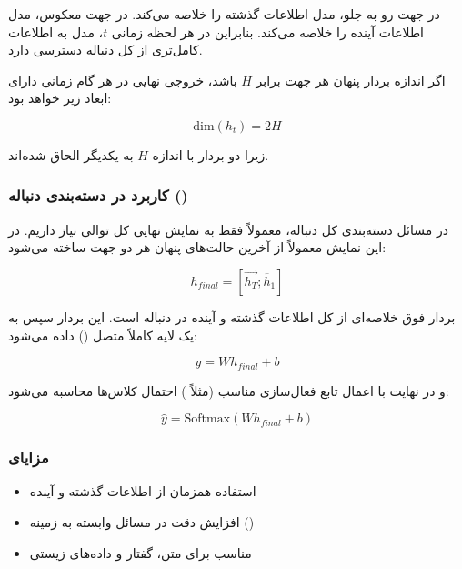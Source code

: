 \documentclass{article}
\begin{document}
در جهت رو به جلو، مدل اطلاعات گذشته را خلاصه می‌کند. 
در جهت معکوس، مدل اطلاعات آینده را خلاصه می‌کند. 
بنابراین در هر لحظه زمانی \( t \)، مدل به اطلاعات کامل‌تری از کل دنباله دسترسی دارد.

اگر اندازه بردار پنهان هر جهت برابر \( H \) باشد، خروجی نهایی در هر گام زمانی دارای ابعاد زیر خواهد بود:

\begin{equation}
	\text{dim}(h_t) = 2H
\end{equation}

زیرا دو بردار با اندازه \( H \) به یکدیگر الحاق شده‌اند.

\subsubsection{کاربرد در دسته‌بندی دنباله ()}

در مسائل دسته‌بندی کل دنباله، معمولاً فقط به نمایش نهایی کل توالی نیاز داریم. 
در  این نمایش معمولاً از آخرین حالت‌های پنهان هر دو جهت ساخته می‌شود:

\begin{equation}
	h_{final} = [\overrightarrow{h_T} ; \overleftarrow{h_1}]
\end{equation}

بردار فوق خلاصه‌ای از کل اطلاعات گذشته و آینده در دنباله است. 
این بردار سپس به یک لایه کاملاً متصل () داده می‌شود:

\begin{equation}
	y = W h_{final} + b
\end{equation}

و در نهایت با اعمال تابع فعال‌سازی مناسب (مثلاً ) احتمال کلاس‌ها محاسبه می‌شود:

\begin{equation}
	\hat{y} = \text{Softmax}(Wh_{final} + b)
\end{equation}

\subsubsection{مزایای }

\begin{itemize}
	\item استفاده همزمان از اطلاعات گذشته و آینده
	\item افزایش دقت در مسائل وابسته به زمینه ()
	\item مناسب برای متن، گفتار و داده‌های زیستی
\end{itemize}
\end{document}
